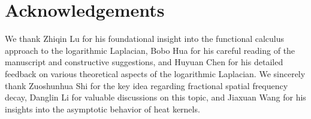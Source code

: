 \documentclass[reqno,12pt]{amsart}
\numberwithin{equation}{section}
\begin{document}
\section{Acknowledgements}

We thank Zhiqin Lu for his foundational insight into the functional calculus approach to the logarithmic Laplacian, Bobo Hua for his careful reading of the manuscript and constructive suggestions, and Huyuan Chen for his detailed feedback on various theoretical aspects of the logarithmic Laplacian. We sincerely thank Zuoshunhua Shi for the key idea regarding fractional spatial frequency decay, Danglin Li for valuable discussions on this topic, and Jiaxuan Wang for his insights into the asymptotic behavior of heat kernels.





	
	
	
	

	
\end{document}
